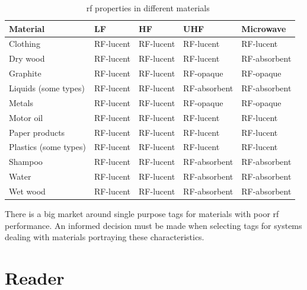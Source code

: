 \begin{table}[!htb]
    \centering
    \caption[\ac{rf} properties in different materials]{\ac{rf} properties in different materials~\cite{lahiriRFIDSourcebook2005}}
    \begin{tabular}{|l|l|l|l|l|}
    \hline
    \textbf{Material}     & \textbf{LF} & \textbf{HF} & \textbf{UHF} & \textbf{Microwave} \\ \hline
    Clothing              & RF-lucent   & RF-lucent   & RF-lucent    & RF-lucent          \\ \hline
    Dry wood              & RF-lucent   & RF-lucent   & RF-lucent    & RF-absorbent       \\ \hline
    Graphite              & RF-lucent   & RF-lucent   & RF-opaque    & RF-opaque          \\ \hline
    Liquids (some types)  & RF-lucent   & RF-lucent   & RF-absorbent & RF-absorbent       \\ \hline
    Metals                & RF-lucent   & RF-lucent   & RF-opaque    & RF-opaque          \\ \hline
    Motor oil             & RF-lucent   & RF-lucent   & RF-lucent    & RF-lucent          \\ \hline
    Paper products        & RF-lucent   & RF-lucent   & RF-lucent    & RF-lucent          \\ \hline
    Plastics (some types) & RF-lucent   & RF-lucent   & RF-lucent    & RF-lucent          \\ \hline
    Shampoo               & RF-lucent   & RF-lucent   & RF-absorbent & RF-absorbent       \\ \hline
    Water                 & RF-lucent   & RF-lucent   & RF-absorbent & RF-absorbent       \\ \hline
    Wet wood              & RF-lucent   & RF-lucent   & RF-absorbent & RF-absorbent       \\ \hline
    \end{tabular}
    \label{tab:rfproperties}
\end{table}

There is a big market around single purpose tags for materials with poor \ac{rf} performance. 
An informed decision must be made when selecting tags for systems dealing with materials portraying these characteristics.

\section{Reader} \label{sec:reader}

